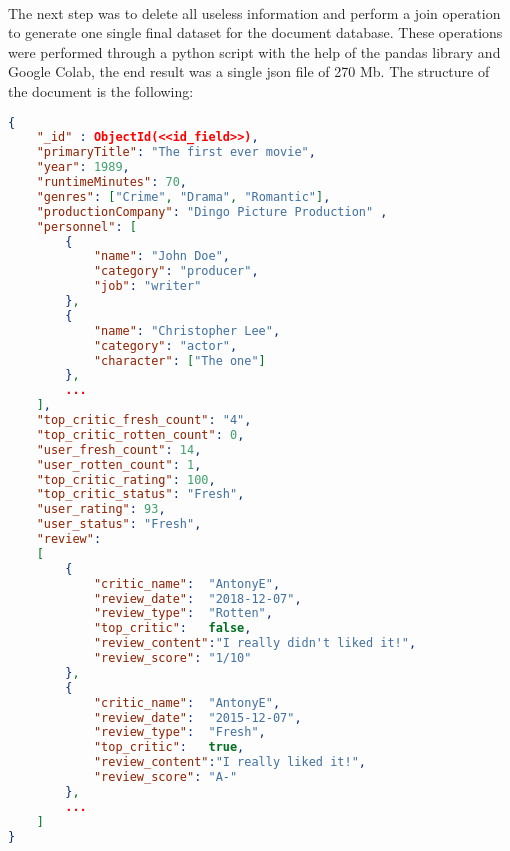 \paragraph{}
The next step was to delete all useless information and perform a join operation to generate one single final dataset for the document database. These operations were performed through a python script with the help of the pandas library and Google Colab, the end result was a single json file of 270 Mb. The structure of the document is the following:
\\
\begin{lstlisting}[language=json,firstnumber=1]
{
    "_id" : ObjectId(<<id_field>>),
    "primaryTitle": "The first ever movie",
    "year": 1989,
    "runtimeMinutes": 70,
    "genres": ["Crime", "Drama", "Romantic"],
    "productionCompany": "Dingo Picture Production" ,
    "personnel": [
        {
            "name": "John Doe",
            "category": "producer",
            "job": "writer"
        },
        {
            "name": "Christopher Lee",
            "category": "actor",
            "character": ["The one"]
        },
        ...
    ],
    "top_critic_fresh_count": "4",
    "top_critic_rotten_count": 0,
    "user_fresh_count": 14,
    "user_rotten_count": 1,
    "top_critic_rating": 100,
    "top_critic_status": "Fresh",
    "user_rating": 93,
    "user_status": "Fresh", 
    "review":
    [ 
        {
            "critic_name": 	"AntonyE",
            "review_date":	"2018-12-07",
            "review_type":	"Rotten",
            "top_critic":	false,
            "review_content":"I really didn't liked it!",
            "review_score":	"1/10"
        },
        {
            "critic_name": 	"AntonyE",
            "review_date":	"2015-12-07",
            "review_type":	"Fresh",
            "top_critic":	true,
            "review_content":"I really liked it!",
            "review_score":	"A-"
        },
        ...
    ]
}

\end{lstlisting}

%